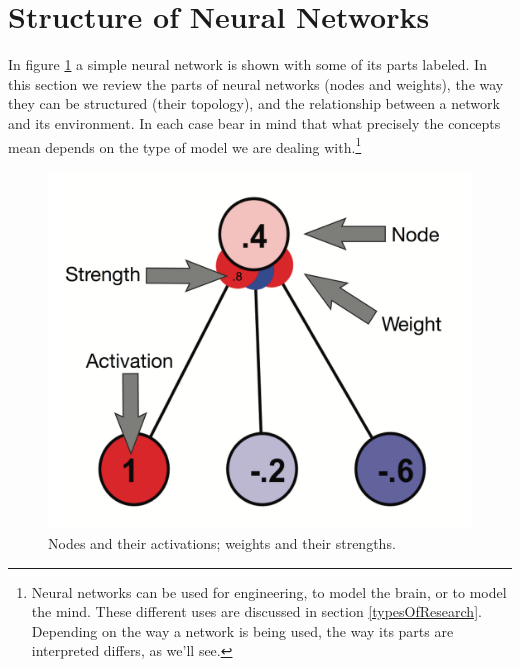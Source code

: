 \section{Structure of Neural Networks}\label{structureNets}

In figure \ref{nodesWeights} a simple neural network is shown with some of its parts labeled. In this section we review the parts of neural networks (nodes and weights), the way they can be structured (their topology), and the relationship between a network and its environment. In each case bear in mind that what precisely the concepts mean depends on the type of model we are dealing with.\footnote{Neural networks can be used for engineering, to model the brain, or to model the mind. These different uses are discussed in section \ref{typesOfResearch}. Depending on the way a network is being used, the way its parts are interpreted differs, as we'll see.} 

\begin{figure}[h]
\centering
\includegraphics[scale=.2]{./images/labelledNet.png}
\caption[Simbrain screenshot with additional elements added by Pamela Payne.]{Nodes and their activations; weights and their strengths.}
\label{nodesWeights}
\end{figure}

